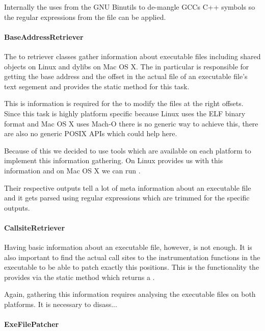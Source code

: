 Internally the  uses  from the GNU Binutils to de-mangle GCCs C++ symbols so the regular expressions from the file can be applied.

\paragraph{BaseAddressRetriever}

The to retriever classes gather information about executable files including shared objects on Linux and dylibs on Mac OS X.  The  in particular is responsible for getting the base address and the offset in the actual file of an executable file's text segement and provides the static method  for this task.

This is information is required for the  to modify the files at the right offsets.  Since this task is highly platform specific because Linux uses the ELF binary format and Mac OS X uses Mach-O there is no generic way to achieve this, there are also no generic POSIX APIs which could help here.

Because of this we decided to use tools which are available on each platform to implement this information gathering.  On Linux  provides us with this information and on Mac OS X we can run .

Their respective outputs tell a lot of meta information about an executable file and it gets parsed using regular expressions which are trimmed for the specific outputs.

\paragraph{CallsiteRetriever}

Having basic information about an executable file, however, is not enough.  It is also important to find the actual call sites to the instrumentation functions in the executable to be able to patch exactly this positions.  This is the functionality the  provides via the static method  which returns a .

Again, gathering this information requires analysing the executable files on both platforms.  It is necessary to disass...

\paragraph{ExeFilePatcher}


